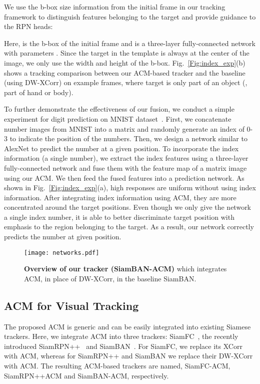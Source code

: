 \documentclass[10pt,twocolumn,letterpaper,final]{cvpr}
\begin{document}
We use the b-box size information from the initial frame in our tracking framework to distinguish features belonging to the target and provide guidance to the RPN heads:

Here,  is the b-box of the initial frame and  is a three-layer fully-connected network with parameters . Since the target in the template is always at the center of the image, we only use the width and height of the b-box. Fig.~\ref{Fig:index_exp}(b) shows a tracking comparison between our ACM-based tracker and the baseline (using DW-XCorr) on example frames, where target is only part of an object (\eg, part of hand or body). 



To further demonstrate the effectiveness of our fusion, we conduct a simple experiment for digit prediction on MNIST dataset~\cite{lecun2010mnist}. 
First, we concatenate number images from MNIST into a  matrix and randomly generate an index of 0-3 to indicate the position of the numbers. Then, we design a network similar to AlexNet to predict the number at a given position. To incorporate the index information (a single number), we extract the index features using a three-layer fully-connected network and fuse them with the feature map of a matrix image using our ACM. We then feed the fused features into a prediction network. As shown in {Fig.~\ref{Fig:index_exp}(a)}, high responses are uniform without using index information. After integrating index information using ACM, they are more concentrated around the target positions. Even though we only give the network a single index number, it is able to better discriminate target position with emphasis to the region belonging to the target. As a result, our network correctly predicts the number at given position. 










\begin{figure}
  \centering
  \texttt{[image: networks.pdf]}
  \caption{\textbf{Overview of our tracker (SiamBAN-ACM)} which integrates ACM, in place of DW-XCorr, in the baseline SiamBAN. 
  }
  \label{Fig:network}
\end{figure} 


\subsection{ACM for Visual Tracking}  \label{section:tracking}
The proposed ACM is generic and can be easily integrated into existing Siamese trackers. Here, we integrate ACM into three trackers: SiamFC~\cite{bertinetto2016fully}, the recently introduced SiamRPN++~\cite{li2019siamrpn} and SiamBAN~\cite{chen2020siamese}. For SiamFC, we replace its XCorr with ACM, whereas for SiamRPN++ and SiamBAN we replace their DW-XCorr with ACM. The resulting ACM-based trackers are named, SiamFC-ACM, SiamRPN++ACM and SiamBAN-ACM, respectively.
\end{document}

